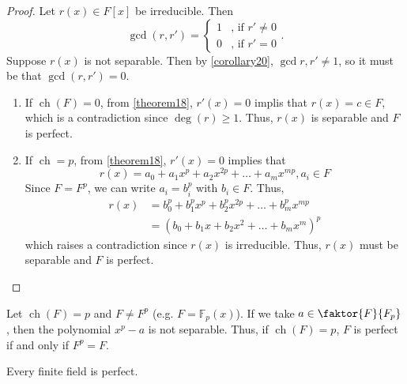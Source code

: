 \documentclass[11pt]{article}
\newcommand{\quotient}[2]{\faktor{#1}{#2}}
\DeclareMathOperator{\ch}{ch}
\begin{document}
\begin{proof}
Let $r(x) \in F[x]$ be irreducible. Then
\begin{equation*}
\gcd(r,r') =
\begin{cases}
1 & \text{, if $r' \neq 0$}\\
0 & \text{, if $r' = 0$}
\end{cases}.
\end{equation*}
Suppose $r(x)$ is not separable. Then by \cref{corollary20}, $\gcd{r,r'} \neq
1$, so it must be that $\gcd(r,r') = 0$.
\begin{enumerate}
\item If $\ch(F) = 0$, from \cref{theorem18}, $r'(x) = 0$ implis that $r(x) = c \in
F$, which is a contradiction since $\deg(r) \geq 1$. Thus, $r(x)$ is separable
and $F$ is perfect.
\item If $\ch = p$, from \cref{theorem18}, $r'(x) = 0$ implies that
\begin{equation*}
r(x) = a_0 + a_1x^p + a_2x^{2p} + \dots + a_mx^{mp}, a_i \in F
\end{equation*}
Since $F = F^p$, we can write $a_i = b_i^p$ with $b_i \in F$. Thus,
\begin{align*}
r(x) &= b_0^p + b^p_1x^p + b^p_2x^{2p} + \dots + b^p_mx^{mp}\\
&= (b_0 + b_1x + b_2x^2 + \dots + b_mx^m)^p
\end{align*}
which raises a contradiction since $r(x)$ is irreducible. Thus, $r(x)$ must be
separable and $F$ is perfect.
\end{enumerate}
\end{proof}
\begin{remark}
Let $\ch(F) = p$ and $F \neq F^p$ (e.g. $F = \mathbb{F}_p(x)$). If we take
$a \in \quotient{F}{F_p}$, then the polynomial $x^p -a$ is not separable. Thus,
if $\ch(F) = p$, $F$ is perfect if and only if $F^p=F$.
\end{remark}
\begin{corollary}
Every finite field is perfect.
\label{corollary27}
\end{corollary}
\end{document}
